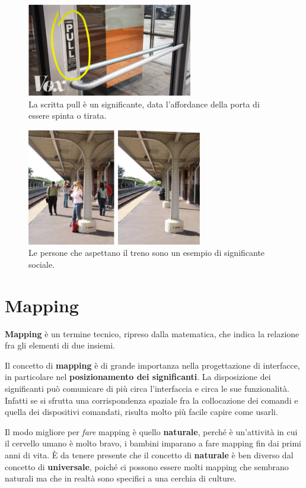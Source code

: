 \pagebreak

\begin{figure}[!h]
	\centering
	\includegraphics[scale = 0.7]{immagini/sign.png}
	\caption{La scritta pull è un significante, data l'affordance della porta di essere spinta o tirata.}
\end{figure}
\begin{figure}[!h]
	\centering
	\includegraphics[scale = 0.7]{immagini/sign1.png}
	\caption{Le persone che aspettano il treno sono un esempio di significante sociale.}
\end{figure}

\section{Mapping}
\textbf{Mapping} è un termine tecnico, ripreso dalla matematica, che indica la relazione fra gli elementi di due insiemi.

Il concetto di \textbf{mapping} è di grande importanza nella progettazione di interfacce, in particolare nel \textbf{posizionamento dei significanti}. La disposizione dei significanti può comunicare di più circa l'interfaccia e circa le sue funzionalità. Infatti se si sfrutta una corrispondenza spaziale fra la collocazione dei comandi e quella dei dispositivi comandati, risulta molto più facile capire come usarli.

Il modo migliore per \textit{fare} mapping è quello \textbf{naturale}, perché è un'attività in cui il cervello umano è molto bravo, i bambini imparano a fare mapping fin dai primi anni di vita. È da tenere presente che il concetto di \textbf{naturale} è ben diverso dal concetto di \textbf{universale}, poiché ci possono essere molti mapping che sembrano naturali ma che in realtà sono specifici a una cerchia di culture.

